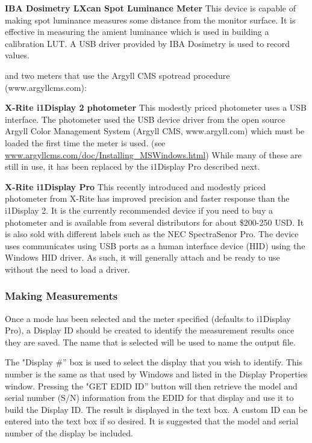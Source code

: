 \textbf{IBA Dosimetry LXcan Spot Luminance Meter} This device is capable of making spot luminance measures some distance from the monitor surface. It is effective in measuring the amient luminance which is used in building a calibration LUT. A USB driver provided by IBA Dosimetry is used to record values. 

and two meters that use the Argyll CMS spotread procedure (www.argyllcms.com):

\textbf{X-Rite i1Display 2 photometer} This modestly priced photometer uses a USB interface. The photometer used the USB device driver from the open source Argyll Color Management System (Argyll CMS, www.argyll.com) which must be loaded the first time the meter is used. (see \href{www.argyllcms.com/doc/Installing_MSWindows.html}{www.argyllcms.com/doc/Installing\_MSWindows.html}) While many of these are still in use, it has been replaced by the i1Display Pro described next. 

\textbf{X-Rite i1Display Pro} This recently introduced and modestly priced photometer from X-Rite has improved precision and faster response than the i1Display 2. It is the currently recommended device if you need to buy a photometer and is available from several distributors for about \$200-250 USD. It is also sold with different labels such as the NEC SpectraSenor Pro. The device uses communicates using USB ports as a human interface device (HID) using the Windows HID driver. As such, it will generally attach and be ready to use without the need to load a driver.

\subsubsection{Making Measurements} 

Once a mode has been selected and the meter specified (defaults to i1Display Pro), a Display ID should be created to identify the measurement results once they are saved. The name that is selected will be used to name the output file. 

The "Display \#'' box is used to select the display that you wish to identify. This number is the same as that used by Windows and listed in the Display Properties window. Pressing the "GET EDID ID'' button will then retrieve the model and serial number (S/N) information from the EDID for that display and use it to build the Display ID. The result is displayed in the text box. A custom ID can be entered into the text box if so desired. It is suggested that the model and serial number of the display be included. 

